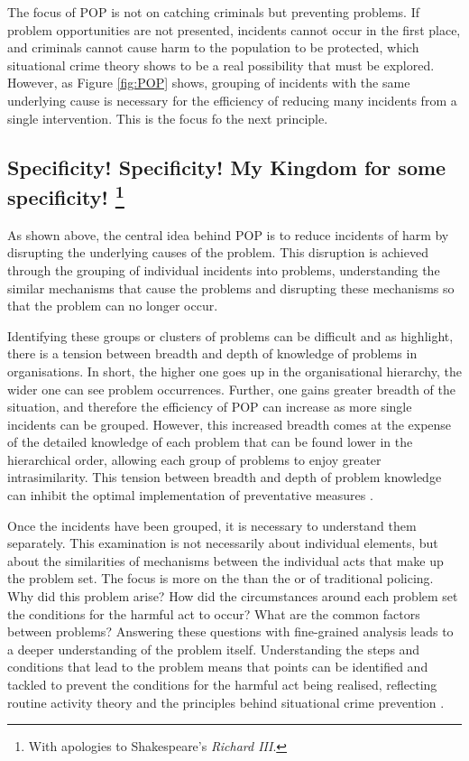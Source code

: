 The focus of POP is not on catching criminals but preventing problems. If problem opportunities are not presented, incidents cannot occur in the first place, and criminals cannot cause harm to the population to be protected, which situational crime theory shows to be a real possibility that must be explored. However, as Figure \ref{fig:POP} shows, grouping of incidents with the same underlying cause is necessary for the efficiency of reducing many incidents from a single intervention.  This is the focus fo the next principle. 

 
 
 \subsection[Specificity! Specificity! My Kingdom for some specificity! ]{Specificity! Specificity! My Kingdom for some specificity! \footnote{With apologies to Shakespeare’s \emph{Richard III}.} }


As shown above, the central idea behind POP is to reduce incidents of harm by disrupting the underlying causes of the problem. This disruption is achieved through the grouping of individual incidents into problems, understanding the similar mechanisms that cause the problems and disrupting these mechanisms so that the problem can no longer occur.

Identifying these groups or clusters of problems can be difficult and as \textcite{scott2012implementing} highlight, there is a tension between breadth and depth of knowledge of problems in organisations. In short, the higher one goes up in the organisational hierarchy, the wider one can see problem occurrences. Further, one gains greater breadth of the situation, and therefore the efficiency of POP can increase as more single incidents can be grouped. However, this increased breadth comes at the expense of the detailed knowledge of each problem that can be found lower in the hierarchical order, allowing each group of problems to enjoy greater intrasimilarity. This tension between breadth and depth of problem knowledge can inhibit the optimal implementation of preventative measures \parencite{maguire2015problem}.

Once the incidents have been grouped, it is necessary to understand them separately. This examination is not necessarily about individual elements, but about the similarities of mechanisms between the individual acts that make up the problem set. The focus is more on the  than the  or  of traditional policing. Why did this problem arise? How did the circumstances around each problem set the conditions for the harmful act to occur? What are the common factors between problems? Answering these questions with fine-grained analysis leads to a deeper understanding of the problem itself. Understanding the steps and conditions that lead to the problem means that points can be identified and tackled to prevent the conditions for the harmful act being realised, reflecting routine activity theory and the principles behind situational crime prevention \parencite{felson1998opportunity}.

